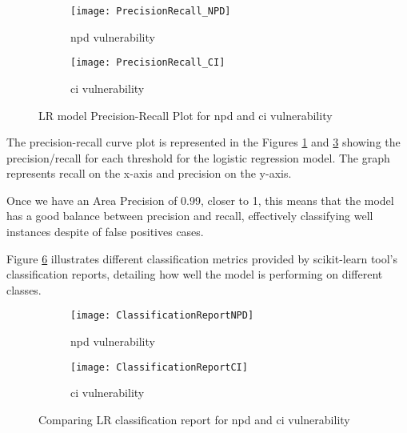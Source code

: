 \begin{figure}
     \begin{subfigure}[ht]{0.5\textwidth}
         \centering
         \texttt{[image: PrecisionRecall\_NPD]}
         \caption{\gls{npd} vulnerability}
         \label{fig:PrecisionRecall_NPD_FIG}
     \end{subfigure}
    \hfill
     \begin{subfigure}[ht]{0.5\textwidth}
         \centering
         \texttt{[image: PrecisionRecall\_CI]}
         \caption{\gls{ci} vulnerability}
         \label{fig:PrecisionRecall_CI_FIG}
     \end{subfigure}
     \caption{LR model Precision-Recall Plot for \gls{npd} and \gls{ci} vulnerability}
     \hfill
\end{figure}

The precision-recall curve plot is represented in the Figures \ref{fig:PrecisionRecall_NPD_FIG} and \ref{fig:PrecisionRecall_CI_FIG} showing the precision/recall for each threshold for the logistic regression model. The graph represents recall on the x-axis and precision on the y-axis.

Once we have an Area Precision of 0.99, closer to 1, this means that the model has a good balance between precision and recall, effectively classifying well instances despite of false positives cases.

Figure \ref{fig:ClassificationReportCI_NPD_FIG} illustrates different classification metrics provided by scikit-learn tool's classification reports, detailing how well the model is performing on different classes.

\newpage

\begin{figure}
     \begin{subfigure}[ht]{0.5\textwidth}
         \centering
         \texttt{[image: ClassificationReportNPD]}
         \caption{\gls{npd} vulnerability}
         \label{fig:ClassificationReportNPD_FIG}
     \end{subfigure}
    \hfill
     \begin{subfigure}[ht]{0.5\textwidth}
         \centering
         \texttt{[image: ClassificationReportCI]}
         \caption{\gls{ci} vulnerability}
         \label{fig:ClassificationReportCI_FIG}
     \end{subfigure}
     \caption{Comparing LR classification report for \gls{npd} and \gls{ci} vulnerability}
     \label{fig:ClassificationReportCI_NPD_FIG}
     \hfill
\end{figure}


